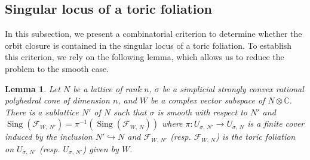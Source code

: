 \documentclass[12pt,reqno]{amsart}
\newtheorem{lemma}[theorem]{Lemma}
\theoremstyle{definition}
\newcommand{\on}{\operatorname}
\newcommand\cF{{\mathcal{F}}}
\newcommand\bC{{\mathbb C}}
\begin{document}
\subsection{Singular locus of a toric foliation}
In this subsection, we present a combinatorial criterion to determine whether the orbit closure is contained in the singular locus of a toric foliation. 
To establish this criterion, we rely on the following lemma, which allows us to reduce the problem to the smooth case. 
\begin{lemma}\label{fol_sing_lem}
    Let $N$ be a lattice of rank $n$, $\sigma$ be a simplicial strongly convex rational polyhedral cone of dimension $n$, and $W$ be a complex vector subspace of $N\otimes\bC$.  
    There is a sublattice $N'$ of $N$ such that $\sigma$ is smooth with respect to $N'$ and $\on{Sing}(\cF_{W,\,N'}) = \pi^{-1}(\on{Sing}(\cF_{W,\,N}))$ where $\pi\colon U_{\sigma,\,N'}\to U_{\sigma,\,N}$ is a finite cover induced by the inclusion $N'\hookrightarrow N$ and $\cF_{W,\,N'}$ (resp. $\cF_{W,\,N}$) is the toric foliation on $U_{\sigma,\,N'}$ (resp. $U_{\sigma,\,N'}$) given by $W$. 
\end{lemma}
\end{document}
